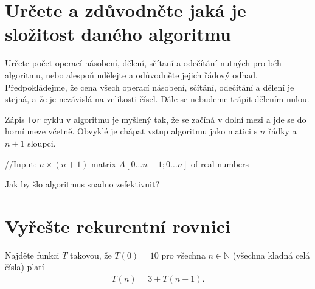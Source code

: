 \documentclass[12pt,oneside]{article}
\begin{document}
	\section{Určete a zdůvodněte jaká je složitost daného algoritmu}
	Určete počet operací násobení, dělení, sčítaní a odečítání nutných pro běh algoritmu, nebo alespoň udělejte a odůvodněte jejich řádový odhad.
	Předpokládejme, že cena všech operací násobení, sčítání, odečítání a dělení je stejná, a že je nezávislá na velikosti čísel.
	Dále se nebudeme trápit dělením nulou.

	Zápis \verb|for| cyklu v algoritmu je myšlený tak, že se začíná v dolní mezi a jde se do horní meze včetně.
	Obvyklé je chápat vstup algoritmu jako matici s $n$ řádky a $n+1$ sloupci.
	\begin{algorithm}[h]
		\caption{What does this do?}
		\DontPrintSemicolon
		//Input: $n\times (n+1)$ matrix $A[0\dots n-1; 0 \dots n]$ of real numbers \;
	\end{algorithm}

	Jak by šlo algoritmus snadno zefektivnit?

	\section{Vyřešte rekurentní rovnici}
	Najděte funkci $T$ takovou, že $T(0) = 10$ pro všechna $n \in \mathbb{N}$ (všechna kladná celá čísla) platí
	\begin{align}
		T(n) = 3 + T(n-1).
	\end{align}
\end{document}
